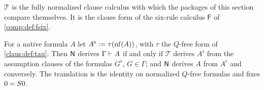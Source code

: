$\mathcal T$ is the fully normalized clause calculus with which the
packages of this section compare themselves. It is the clause form of the
six-rule calculus $\mathsf F$ of \cref{comp:def:fsix}.

\begin{proposition}
\label{disch:prop:kernel}
For a native formula $A$ let $A^{\flat}\mathrel{:=}\tau(\operatorname{nf}(A))$, with $\tau$
the $Q$-free form of \cref{claus:def:tau}. Then $\mathsf{N}$ derives
$\Gamma\vdash A$ if and only if $\mathcal T$ derives $A^{\flat}$ from the
assumption clauses of the formulas $G^{\flat}$, $G\in\Gamma$; and $\mathsf{N}$
derives $A$ from $A^\flat$ and conversely. The translation is the identity
on normalized $Q$-free formulas and fixes $0=S 0$.
\end{proposition}

